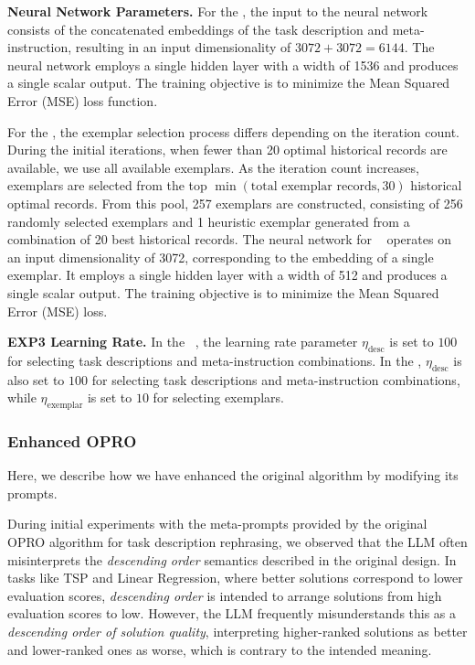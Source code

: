 \textbf{Neural Network Parameters.}
For the \alg, the input to the neural network consists of the concatenated embeddings of the task description and meta-instruction, resulting in an input dimensionality of \(3072 + 3072 = 6144\). The neural network employs a single hidden layer with a width of 1536 and produces a single scalar output. The training objective is to minimize the Mean Squared Error (MSE) loss function.

For the \alges, the exemplar selection process differs depending on the iteration count. During the initial iterations, when fewer than 20 optimal historical records are available, we use all available exemplars. As the iteration count increases, exemplars are selected from the top \(\min(\text{total exemplar records}, 30)\) historical optimal records. From this pool, 257 exemplars are constructed, consisting of 256 randomly selected exemplars and 1 heuristic exemplar
generated from a combination of 20 best historical records. The neural network for \alges~ operates on an input dimensionality of 3072, corresponding to the embedding of a single exemplar. It employs a single hidden layer with a width of 512 and produces a single scalar output. The training objective is to minimize the Mean Squared Error (MSE) loss.

\textbf{EXP3 Learning Rate.}
In the \alg~, the learning rate parameter \(\eta_{\text{desc}}\) is set to \(100\) for selecting task descriptions and meta-instruction combinations. In the \alges, \(\eta_{\text{desc}}\) is also set to \(100\) for selecting task descriptions and meta-instruction combinations, while \(\eta_{\text{exemplar}}\) is set to \(10\) for selecting exemplars.



\subsubsection{Enhanced OPRO}
\label{app:sec:enhanced:opro}
Here, we describe how we have enhanced the original algorithm \cite{yang2023large} by modifying its prompts.

During initial experiments with the meta-prompts provided by the original OPRO algorithm \cite{yang2023large} for task description rephrasing, we observed that the LLM often misinterprets the \emph{descending order} semantics described in the original design. 
In tasks like TSP and Linear Regression, where better solutions correspond to lower evaluation scores, \emph{descending order} is intended to arrange solutions from high evaluation scores to low. However, the LLM frequently misunderstands this as a \emph{descending order of solution quality}, interpreting higher-ranked solutions as better and lower-ranked ones as worse, which is contrary to the intended meaning.

